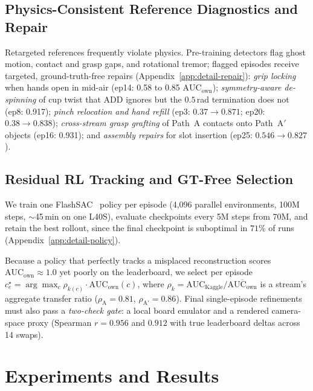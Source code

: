 \documentclass[10pt]{nvidiaextabstract}
\newcommand{\ownauc}{\ensuremath{\mathrm{AUC}_{\text{own}}}\xspace}
\begin{document}
\subsection{Physics-Consistent Reference Diagnostics and Repair}
\label{sec:repair}

Retargeted references frequently violate physics. Pre-training detectors flag ghost motion, contact and grasp gaps, and rotational tremor; flagged episodes receive targeted, ground-truth-free repairs (Appendix~\ref{app:detail-repair}): \emph{grip locking} when hands open in mid-air (ep14: 0.58 to 0.85 \ownauc); \emph{symmetry-aware de-spinning} of cup twist that ADD ignores but the $0.5$\,rad termination does not (ep8: 0.917); \emph{pinch relocation and hand refill} (ep3: $0.37 \rightarrow 0.871$; ep20: $0.38 \rightarrow 0.838$); \emph{cross-stream grasp grafting} of Path~A contacts onto Path~A$'$ objects (ep16: 0.931); and \emph{assembly repairs} for slot insertion (ep25: $0.546 \rightarrow 0.827$).

\subsection{Residual RL Tracking and GT-Free Selection}
\label{sec:policy}

We train one FlashSAC~\cite{flashchord,haarnoja2018sac} policy per episode (4,096 parallel environments, 100M steps, $\sim$45\,min on one L40S), evaluate checkpoints every 5M steps from 70M, and retain the best rollout, since the final checkpoint is suboptimal in $71\%$ of runs (Appendix~\ref{app:detail-policy}).

Because a policy that perfectly tracks a misplaced reconstruction scores $\ownauc \approx 1.0$ yet poorly on the leaderboard, we select per episode $c^\star_e = \arg\max_{c} \rho_{k(c)} \cdot \ownauc(c)$, where $\rho_k = \mathrm{AUC}_{\text{Kaggle}} / \overline{\ownauc}$ is a stream's aggregate transfer ratio ($\rho_{\text{A}} = 0.81$, $\rho_{\text{A}'} = 0.86$). Final single-episode refinements must also pass a \emph{two-check gate}: a local board emulator and a rendered camera-space proxy (Spearman $r=0.956$ and $0.912$ with true leaderboard deltas across 14 swaps).

\section{Experiments and Results}
\label{sec:experiments}
\end{document}
